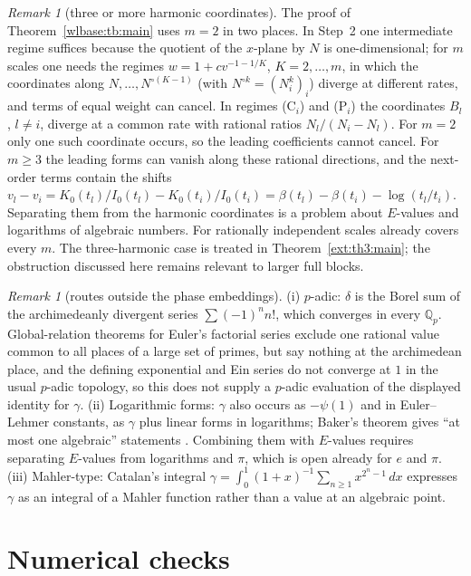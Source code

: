 \documentclass[11pt,a4paper]{article}
\theoremstyle{definition}\newtheorem{definition}[theorem]{Definition}
\theoremstyle{remark}\newtheorem{remark}[theorem]{Remark}
\newcommand{\Q}{\mathbb Q}\newcommand{\R}{\mathbb R}
\begin{document}
\begin{remark}[three or more harmonic coordinates]\label{wlbase:lim:three}
The proof of Theorem~\ref{wlbase:tb:main} uses $m=2$ in two places. In Step~2 one
intermediate regime suffices because the quotient of the $x$-plane by $N$ is
one-dimensional; for $m$ scales one needs the regimes $w=1+cv^{-1-1/K}$,
$K=2,\dots,m$, in which the coordinates along $N,\dots,N^{\circ(K-1)}$ (with
$N^{\circ k}=(N_i^k)_i$) diverge at different rates, and terms of equal weight
can cancel. In regimes (C$_i$) and (P$_i$) the coordinates $B_l$, $l\ne i$,
diverge at a common rate with rational ratios $N_l/(N_i-N_l)$. For $m=2$ only
one such coordinate occurs, so the leading coefficients cannot cancel. For
$m\ge3$ the leading forms can vanish along these rational directions, and the
next-order terms contain the shifts
$v_l-v_i=K_0(t_l)/I_0(t_l)-K_0(t_i)/I_0(t_i)
=\beta(t_l)-\beta(t_i)-\log(t_l/t_i)$. Separating them from the harmonic
coordinates is a problem about $E$-values and logarithms of algebraic
numbers. For rationally independent scales \cite[Theorem~mbmulti:main]{EB}
already covers every $m$.
The three-harmonic case is treated in Theorem~\ref{ext:th3:main};
the obstruction discussed here remains relevant to larger full blocks.
\end{remark}

\begin{remark}[routes outside the phase embeddings]
(i) $p$-adic: $\delta$ is the Borel sum of the archimedeanly divergent series $\sum(-1)^nn!$, which
converges in every $\Q_p$. Global-relation theorems for Euler's factorial
series \cite{MZ} exclude one rational value common to all places of a large
set of primes, but say nothing at the archimedean place, and
the defining exponential and Ein series do not converge at $1$ in
the usual $p$-adic topology, so this does not supply a $p$-adic evaluation
of the displayed identity for $\gamma$.
(ii) Logarithmic forms: $\gamma$ also occurs as $-\psi(1)$ and in Euler--Lehmer
constants, as $\gamma$ plus linear forms in logarithms; Baker's theorem gives
``at most one algebraic'' statements \cite{MS}. Combining them with $E$-values
requires separating $E$-values from logarithms and $\pi$, which is open
already for $e$ and $\pi$. (iii) Mahler-type: Catalan's integral
$\gamma=\int_0^1(1+x)^{-1}\sum_{n\ge1}x^{2^n-1}\,dx$ expresses $\gamma$ as
an integral of a Mahler function rather than a value at an algebraic point.
\end{remark}

\section{Numerical checks}
\end{document}
